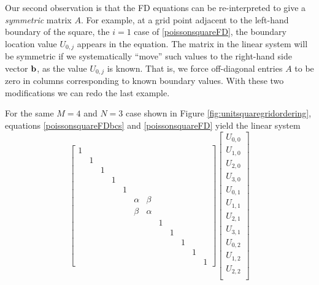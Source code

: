 Our second observation is that the FD equations can be re-interpreted to give a \emph{symmetric} matrix $A$.  For example, at a grid point adjacent to the left-hand boundary of the square, the $i=1$ case of \eqref{poissonsquareFD}, the boundary location value $U_{0,j}$ appears in the equation.  The matrix in the linear system will be symmetric if we systematically ``move'' such values to the right-hand side vector $\mathbf{b}$, as the value $U_{0,j}$ is known.  That is, we force off-diagonal entries $A$ to be zero in columns corresponding to known boundary values.  With these two modifications we can redo the last example.

\medskip\noindent\hrulefill
\begin{example} \label{exampleredo} For the same $M=4$ and $N=3$ case shown in Figure \ref{fig:unitsquaregridordering}, equations \eqref{poissonsquareFDbcs} and \eqref{poissonsquareFD} yield the linear system
\begin{equation*}
\begin{bmatrix}
1 &  &  &  &  &  &  &  &  &  &  &  \\
  & 1&  &  &  &  &  &  &  &  &  &  \\
  &  & 1&  &  &  &  &  &  &  &  &  \\
  &  &  & 1&  &  &  &  &  &  &  &  \\
  &  &  &  & 1&  &  &  &  &  &  &  \\
  &  &  &  &  & \alpha& \beta&  &  &  &  &  \\
  &  &  &  &  & \beta& \alpha&  &  &  &  &  \\
  &  &  &  &  &  &  & 1&  &  &  &  \\
  &  &  &  &  &  &  &  & 1&  &  &  \\
  &  &  &  &  &  &  &  &  & 1&  &  \\
  &  &  &  &  &  &  &  &  &  & 1&  \\
  &  &  &  &  &  &  &  &  &  &  & 1
\end{bmatrix}
\begin{bmatrix}
U_{0,0} \\
U_{1,0} \\
U_{2,0} \\
U_{3,0} \\
U_{0,1} \\
U_{1,1} \\
U_{2,1} \\
U_{3,1} \\
U_{0,2} \\
U_{1,2} \\
U_{2,2} \\

\end{bmatrix}
\end{equation*}
\end{example}
